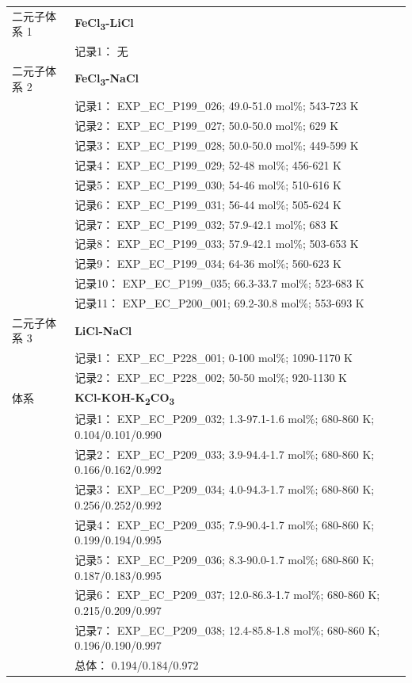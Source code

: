 \documentclass[12pt]{article}
\begin{document}
{\begin{longtable}[]{@{}
  >{\raggedright\arraybackslash}p{}
  >{\raggedright\arraybackslash}p{}@{}}
二元子体系 1 & \textbf{FeCl\textsubscript{3}-LiCl} \\
 & 记录1： 无 \\
二元子体系 2  & \textbf{FeCl\textsubscript{3}-NaCl} \\
 & 记录1： EXP\_EC\_P199\_026; 49.0-51.0 mol\%; 543-723 K \\
 & 记录2： EXP\_EC\_P199\_027; 50.0-50.0 mol\%; 629 K \\
 & 记录3： EXP\_EC\_P199\_028; 50.0-50.0 mol\%; 449-599 K \\
 & 记录4： EXP\_EC\_P199\_029; 52-48 mol\%; 456-621 K \\
 & 记录5： EXP\_EC\_P199\_030; 54-46 mol\%; 510-616 K \\
 & 记录6： EXP\_EC\_P199\_031; 56-44 mol\%; 505-624 K \\
 & 记录7： EXP\_EC\_P199\_032; 57.9-42.1 mol\%; 683 K \\
 & 记录8： EXP\_EC\_P199\_033; 57.9-42.1 mol\%; 503-653 K \\
 & 记录9： EXP\_EC\_P199\_034; 64-36 mol\%; 560-623 K \\
 & 记录10： EXP\_EC\_P199\_035; 66.3-33.7 mol\%; 523-683 K \\
 & 记录11： EXP\_EC\_P200\_001; 69.2-30.8 mol\%; 553-693 K  \\

二元子体系 3  & \textbf{LiCl-NaCl} \\
 & 记录1： EXP\_EC\_P228\_001; 0-100 mol\%; 1090-1170 K \\
 & 记录2： EXP\_EC\_P228\_002; 50-50 mol\%; 920-1130 K  \\

\midrule
体系 & \textbf{KCl-KOH-K\textsubscript{2}CO\textsubscript{3}} \\
 & 记录1： EXP\_EC\_P209\_032; 1.3-97.1-1.6 mol\%; 680-860 K; 0.104/0.101/0.990 \\
 & 记录2： EXP\_EC\_P209\_033; 3.9-94.4-1.7 mol\%; 680-860 K; 0.166/0.162/0.992 \\
 & 记录3： EXP\_EC\_P209\_034; 4.0-94.3-1.7 mol\%; 680-860 K; 0.256/0.252/0.992 \\
 & 记录4： EXP\_EC\_P209\_035; 7.9-90.4-1.7 mol\%; 680-860 K; 0.199/0.194/0.995 \\
 & 记录5： EXP\_EC\_P209\_036; 8.3-90.0-1.7 mol\%; 680-860 K; 0.187/0.183/0.995 \\
 & 记录6： EXP\_EC\_P209\_037; 12.0-86.3-1.7 mol\%; 680-860 K; 0.215/0.209/0.997 \\
 & 记录7： EXP\_EC\_P209\_038; 12.4-85.8-1.8 mol\%; 680-860 K; 0.196/0.190/0.997 \\
 & 总体： 0.194/0.184/0.972  \\


\end{longtable}}
\end{document}
